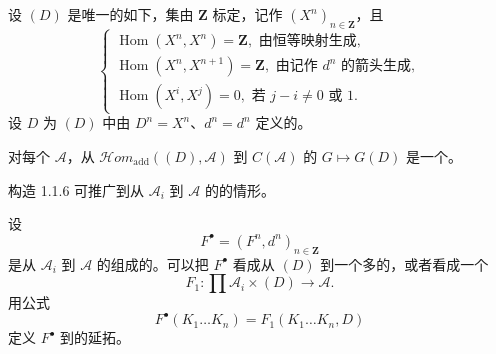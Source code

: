 设 $(D)$ 是唯一的如下，集由 $\mathbf Z$ 标定，记作 $(X^n)_{n\in\mathbf Z}$，且
\[
\begin{cases}
\operatorname{Hom}(X^n,X^n)=\mathbf Z,\text{ 由恒等映射生成},\\
\operatorname{Hom}(X^n,X^{n+1})=\mathbf Z,\text{ 由记作 }d^n\text{ 的箭头生成},\\
\operatorname{Hom}(X^i,X^j)=0,\text{ 若 }j-i\ne0\text{ 或 }1.
\end{cases}\tag{1.1.11.1}
\]
设 $D$ 为 $(D)$ 中由 $D^n=X^n$、$d^n=d^n$ 定义的。

对每个 $\mathcal A$，从 $\mathcal H\!om_{\mathrm{add}}((D),\mathcal A)$ 到 $C(\mathcal A)$ 的 $G\mapsto G(D)$ 是一个。

构造 1.1.6 可推广到从 $\mathcal A_i$ 到 $\mathcal A$ 的的情形。

设
\[
F^{\bullet}=(F^n,d^n)_{n\in\mathbf Z}
\]
是从 $\mathcal A_i$ 到 $\mathcal A$ 的组成的。可以把 $F^{\bullet}$ 看成从 $(D)$ 到一个多的，或者看成一个
\[
F_1:\prod\mathcal A_i\times(D)\longrightarrow\mathcal A.
\]
用公式
\[
F^{\bullet}(K_1\dots K_n)=F_1(K_1\dots K_n,D)\tag{1.1.11.2}
\]
定义 $F^{\bullet}$ 到的延拓。


